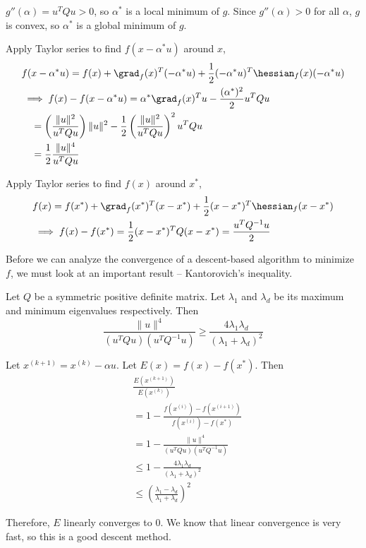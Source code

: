 $g''(\alpha) = u^TQu > 0$, so $\alpha^*$ is a local minimum of $g$.
Since $g''(\alpha) > 0$ for all $\alpha$, $g$ is convex, so $\alpha^*$ is a global minimum of $g$.

Apply Taylor series to find $f(x - \alpha^*u)$ around $x$,
\begin{align*}
& f(x - \alpha^* u) = f(x) + \grad_f(x)^T(-\alpha^*u) + \frac{1}{2}(-\alpha^*u)^T \hessian_f(x) (-\alpha^*u)
\\ &\implies f(x) - f(x - \alpha^* u) = \alpha^* \grad_f(x)^T u - \frac{(\alpha^*)^2}{2}u^T Q u
\\ & \quad = \left( \frac{\|u\|^2}{u^T Q u} \right) \|u\|^2
- \frac{1}{2}\left( \frac{\|u\|^2}{u^T Q u} \right)^2 u^T Q u
\\ & \quad = \frac{1}{2} \frac{\|u\|^4}{u^T Q u}
\end{align*}

Apply Taylor series to find $f(x)$ around $x^*$,
\begin{align*}
& f(x) = f(x^*) + \grad_f(x^*)^T (x - x^*) + \frac{1}{2} (x-x^*)^T \hessian_f (x - x^*)
\\ &\implies f(x) - f(x^*) = \frac{1}{2} (x-x^*)^T Q (x - x^*) = \frac{u^T Q^{-1} u}{2}
\end{align*}

Before we can analyze the convergence of a descent-based algorithm to minimize $f$,
we must look at an important result -- Kantorovich's inequality.

\begin{theorem}
Let $Q$ be a symmetric positive definite matrix.
Let $\lambda_1$ and $\lambda_d$ be its maximum and minimum eigenvalues respectively. Then
\[ \frac{\|u\|^4}{(u^TQu)(u^TQ^{-1}u)} \ge \frac{4\lambda_1\lambda_d}{(\lambda_1 + \lambda_d)^2} \]
\end{theorem}

Let $x^{(k+1)} = x^{(k)} - \alpha u$.
Let $E(x) = f(x) - f(x^*)$. Then
\begin{align*}
& \frac{E(x^{(k+1)})}{E(x^{(k)})}
\\ &= 1 - \frac{f(x^{(i)}) - f(x^{(i+1)})}{f(x^{(i)}) - f(x^*)}
\\ &= 1 - \frac{\|u\|^4}{(u^TQu)(u^TQ^{-1}u)}
\\ &\le 1 - \frac{4\lambda_1\lambda_d}{(\lambda_1 + \lambda_d)^2} \tag{by Kantorovich's inequality}
\\ &\le \left(\frac{\lambda_1 - \lambda_d}{\lambda_1 + \lambda_d} \right)^2
\end{align*}

Therefore, $E$ linearly converges to 0.
We know that linear convergence is very fast, so this is a good descent method.



